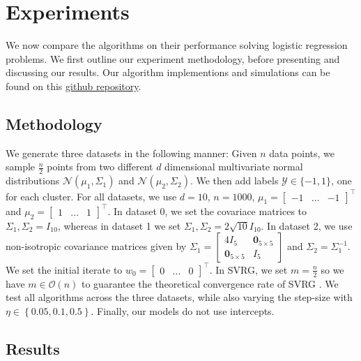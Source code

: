 \section{Experiments}

We now compare the algorithms on their performance solving logistic regression problems. We first outline our experiment methodology, before presenting and discussing our results. Our algorithm implementions and simulations can be found on this \href{https://github.com/EdmundHofflin/Statistical_Machine_Learning_Project}{github repository}.

\subsection{Methodology}

We generate three datasets in the following manner: Given $n$ data points, we sample $\frac{n}{2}$ points from two different $d$ dimensional multivariate normal distributions $\mathcal{N}(\mu_1, \Sigma_1)$ and $\mathcal{N}(\mu_2, \Sigma_2)$. We then add labels $\mathcal{Y} \in \{-1, 1\}$, one for each cluster. For all datasets, we use $d=10$, $n = 1000$, $\mu_1 = \begin{bmatrix} -1 & \ldots & -1 \end{bmatrix}^\top$ and $\mu_2 = \begin{bmatrix} 1 & \ldots & 1 \end{bmatrix}^\top$. In dataset 0, we set the covariace matrices to $\Sigma_1, \Sigma_2 = \mathit{I}_{10}$, whereas in dataset 1 we set $\Sigma_1, \Sigma_2 = 2 \sqrt{10}\mathit{I}_{10}$. In dataset 2, we use non-isotropic covariance matrices given by 
$\Sigma_1 = \begin{bmatrix}
        4\mathit{I}_{5} & \mathbf{0}_{5 \times 5} \\ \mathbf{0}_{5 \times 5} & \mathit{I}_{5}
    \end{bmatrix}$
and $\Sigma_2 = \Sigma_1^{-1}.$
We set the initial iterate to $w_0 = \begin{bmatrix} 0 & \ldots & 0 \end{bmatrix}^\top$.
In SVRG, we set $m = \frac{n}{2}$ so we have $m \in \mathcal{O}(n)$ to guarantee the theoretical convergence rate of SVRG \cite{reddi2016stochastic}. We test all algorithms across the three datasets, while also varying the step-size with $\eta \in \left\{0.05, 0.1, 0.5\right\}$. Finally, our models do not use intercepts.

\subsection{Results}


